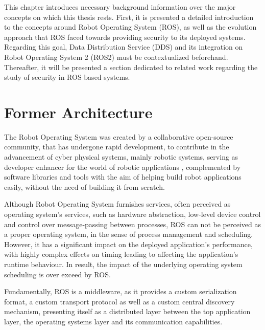 This chapter introduces necessary background information over the major concepts on which this thesis rests. First, it is presented a detailed introduction to the concepts around Robot Operating System (ROS), as well as the evolution approach that ROS faced towards providing security to its deployed systems. Regarding this goal, Data Distribution Service (DDS) and its integration on Robot Operating System 2 (ROS2) must be contextualized beforehand. Thereafter, it will be presented a section dedicated to related work regarding the study of security in ROS based systems.


\section{Former Architecture}

The Robot Operating System was created by a collaborative open-source community, that has undergone rapid development, to contribute in the advancement of cyber physical systems, mainly robotic systems, serving as developer enhancer for the world of robotic applications \cite{diluoffo2018robot}, complemented by software libraries and tools with the aim of helping build robot applications easily, without the need of building it from scratch.

Although Robot Operating System furnishes services, often perceived as operating system's services, such as hardware abstraction, low-level device control and control over message-passing between processes, ROS can not be perceived as a proper operating system, in the sense of process management and scheduling. However, it has a significant impact on the deployed application's performance, with highly complex effects on timing leading to affecting the application's runtime behaviour. In result, the impact of the underlying operating system scheduling is over exceed by ROS. \cite{intro-ros, casini2019response} 

Fundamentally, ROS is a middleware, as it provides a custom serialization format, a custom transport protocol as well as a custom central discovery mechanism, presenting itself as a distributed layer between the top application layer, the operating systems layer and its communication capabilities. 

